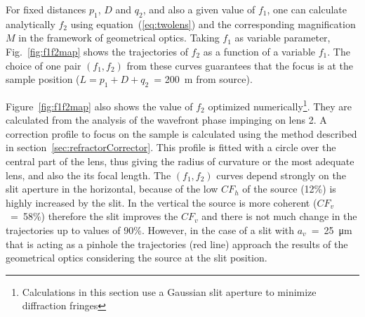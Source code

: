 \documentclass{iucr}              %
\begin{document}
For fixed distances $p_1$, $D$ and $q_2$, and also a given value of $f_1$, one can calculate analytically $f_2$ using  equation~(\ref{eq:twolens}) and the corresponding magnification $M$ in the framework of geometrical optics. Taking $f_1$ as variable parameter,  
Fig.~\ref{fig:f1f2map} shows the trajectories of $f_2$ as a function of a variable $f_1$. 
The choice of one pair $(f_1,f_2)$ from these curves guarantees that the focus is at the sample position ($L=p_1+D+q_2$~= \SI{200}{\meter} from source).

Figure~\ref{fig:f1f2map} also shows the value of $f_2$ optimized numerically\footnote{Calculations in this section use a Gaussian slit aperture to minimize diffraction fringes}. 
They are calculated from the analysis of the wavefront phase impinging on lens 2. A correction profile to focus on the sample is calculated using the method described in section~\ref{sec:refractorCorrector}. This profile is fitted with a circle over the central part of the lens, thus giving the radius of curvature or the most adequate lens, and also the its focal length. 
The $(f_1,f_2)$ curves depend strongly on the slit aperture in the horizontal, because of the low $CF_h$ of the source (12\%) is highly increased by the slit. In the vertical the source is more coherent ($CF_v$~=~58\%) therefore the slit improves the $CF_v$  and there is not much change in the trajectories up to values of 90\%. However, in the case of a slit with $a_v$~=~\SI{25}{\micro\meter} that is acting as a pinhole the trajectories (red line) approach the results of the geometrical optics considering the source at the slit position.
\end{document}
